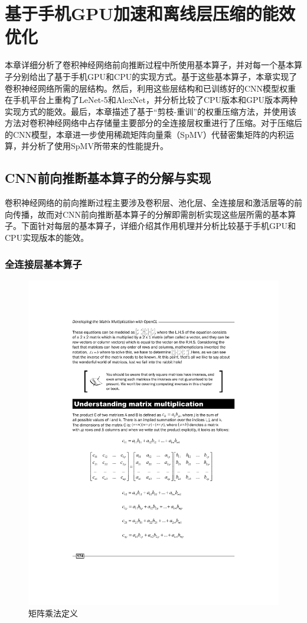 \chapter{基于手机GPU加速和离线层压缩的能效优化}
\label{chapter:chapter3}

本章详细分析了卷积神经网络前向推断过程中所使用基本算子，并对每一个基本算子分别给出了基于手机GPU和CPU的实现方式。基于这些基本算子，本章实现了卷积神经网络所需的层结构。然后，利用这些层结构和已训练好的CNN模型权重在手机平台上重构了LeNet-5和AlexNet，并分析比较了CPU版本和GPU版本两种实现方式的能效。最后，本章描述了基于“剪枝-重训”的权重压缩方法，并使用该方法对卷积神经网络中占存储量主要部分的全连接层权重进行了压缩。对于压缩后的CNN模型，本章进一步使用稀疏矩阵向量乘（SpMV）代替密集矩阵的内积运算，并分析了使用SpMV所带来的性能提升。

\section{CNN前向推断基本算子的分解与实现}
\label{chapter:chapter3-1}
卷积神经网络的前向推断过程主要涉及卷积层、池化层、全连接层和激活层等的前向传播，故而对CNN前向推断基本算子的分解即需剖析实现这些层所需的基本算子。下面针对每层的基本算子，详细介绍其作用机理并分析比较基于手机GPU和CPU实现版本的能效。

\subsection{全连接层基本算子}

\begin{figure}[htbp]
    \begin{center}
    \includegraphics[height=0.5\textwidth]{figures/mat.pdf}
    \end{center}
    \caption{矩阵乘法定义}\label{figure:figure8}
\end{figure}

